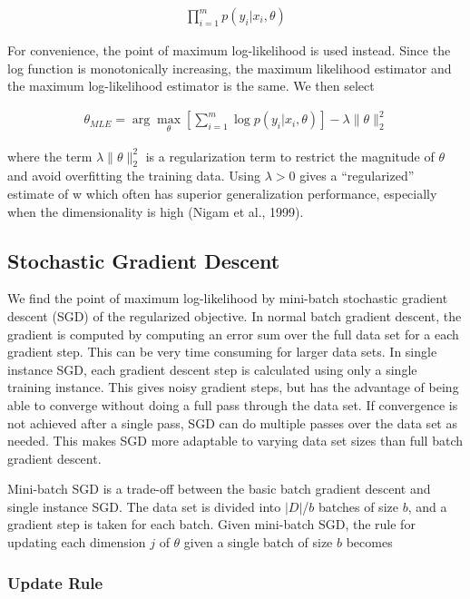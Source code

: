    \begin{eqnarray}
   \prod_{i=1}^{m} p(y_i | x_i,\theta)
   \end{eqnarray}
   
For convenience, the point of maximum log-likelihood is used instead. Since the log function is monotonically increasing, the maximum likelihood estimator and the maximum log-likelihood estimator is the same. We then select
 
  \begin{eqnarray}
  \theta_{MLE} = \arg\max_\theta [\sum_{i=1}^{m} \log p(y_i | x_i,\theta)] - \lambda \|\theta\|^{2}_{2}
  \end{eqnarray}
  
where the term $\lambda\|\theta\|^{2}_{2}$ is a regularization term to restrict the magnitude of $\theta$ and avoid overfitting the training data. Using $\lambda > 0$ gives a “regularized” estimate of w which often has superior generalization performance, especially when the dimensionality is high (Nigam et al., 1999). 

\subsection{Stochastic Gradient Descent}
\label{sec:gradient_descent}
We find the point of maximum log-likelihood by mini-batch stochastic gradient descent (SGD) of the regularized objective. In normal batch gradient descent, the gradient is computed by computing an error sum over the full data set for a each gradient step. This can be very time consuming for larger data sets. In single instance SGD, each gradient descent step is calculated using only a single training instance. This gives noisy gradient steps, but has the advantage of being able to converge without doing a full pass through the data set. If convergence is not achieved after a single pass, SGD can do multiple passes over the data set as needed. This makes SGD more adaptable to varying data set sizes than full batch gradient descent. 

Mini-batch SGD is a trade-off between the basic batch gradient descent and single instance SGD\citep{cotter2011batchsgd}. The data set is divided into $|D|$/$b$ batches of size $b$, and a gradient step is taken for each batch. Given mini-batch SGD, the rule for updating each dimension $j$ of $\theta$ given a single batch of size $b$ becomes

\subsubsection{Update Rule}

